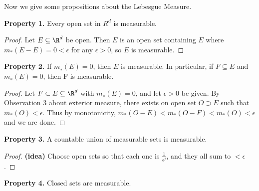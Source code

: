 \documentclass[a5paper, oneside]{book}
\numberwithin{theorem}{chapter}
\begin{document}
Now we give some propositions about the Lebesgue Measure. 

\begin{highlight}
\textbf{Property 1.} Every open set in $R^d$ is measurable.
\end{highlight}
\begin{proof}
Let $E\subseteq\R^d$ be open. Then $E$ is an open set containing $E$ where $m_*(E-E)=0<\epsilon$ for any $\epsilon>0$, so $E$ is measurable. 
\end{proof}

\begin{highlight}
\textbf{Property 2.} If $m_{∗}(E)=0$, then $E$ is measurable. In particular, if $F\subseteq E$ and $m_∗(E) = 0$, then F is measurable.
\end{highlight}
\begin{proof}
Let $F\subset E\subseteq\R^d$ with $m_{∗}(E)=0$, and let $\epsilon>0$ be given. By Observation 3 about exterior measure, there exists on open set $O\supset E$ such that $m_*(O)<\epsilon$. Thus by monotonicity, $m_*(O-E)<m_*(O-F)<m_*(O)<\epsilon$ and we are done. 
\end{proof}

\begin{highlight}
\textbf{Property 3.} A countable union of measurable sets is measurable.
\end{highlight}
\begin{proof}
\textbf{(idea)} Choose open sets so that each one is $\frac{1}{\epsilon^j}$, and they all sum to $<\epsilon$. 
\end{proof}

\begin{highlight}
\textbf{Property 4.} Closed sets are measurable. 
\end{highlight}
\end{document}
